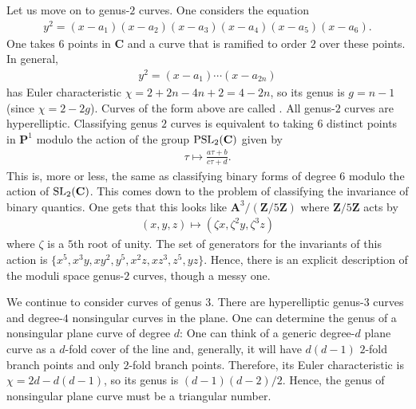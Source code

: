 \documentclass[11pt, oneside,margin=1in]{article}
\begin{document}
Let us move on to genus-$2$ curves. One considers the equation
\begin{align*}
	y^2 = (x-a_1)(x-a_2)(x-a_3)(x-a_4) (x-a_5) (x-a_6).
\end{align*}
One takes $6$ points in $\mathbf{C}$ and a curve that is ramified to order $2$ over these points. In general,
\begin{align*}
	y^2 = (x-a_1)\cdots (x-a_{2n})
\end{align*}
has Euler characteristic $\chi = 2+2n-4n +2 = 4-2n$, so its genus is $g=n-1$ (since $\chi = 2-2g$). Curves of the form above are called . All genus-$2$ curves are hyperelliptic. Classifying genus $2$ curves is equivalent to taking $6$ distinct points in $\mathbf{P}^1$ modulo the action of the group $\operatorname{PSL}_{2}(\mathbf{C})$ given by
\begin{align*}
	\tau \longmapsto \frac{a\tau+b}{c\tau+d}.
\end{align*}
This is, more or less, the same as classifying binary forms of degree $6$ modulo the action of $\operatorname{SL}_{2}(\mathbf{C})$. This comes down to the problem of classifying the invariance of binary quantics. One gets that this looks like $\mathbf{A}^3/(\mathbf{Z}/5\mathbf{Z})$ where $\mathbf{Z}/5\mathbf{Z}$ acts by
\begin{align*}
	(x,y,z) \longmapsto  (\zeta x,\zeta^2 y, \zeta^3 z)
\end{align*}
where $\zeta$ is a $5$th root of unity. The set of generators for the invariants of this action is $\{x^5,x^3y,xy^2,y^5,x^2z, xz^3, z^5, yz\}$. Hence, there is an explicit description of the moduli space genus-$2$ curves, though a messy one. 

We continue to consider curves of genus $3$. There are hyperelliptic genus-$3$ curves and degree-$4$ nonsingular curves in the plane. One can determine the genus of a nonsingular plane curve of degree $d$: One can think of a generic degree-$d$ plane curve as a $d$-fold cover of the line and, generally, it will have $d(d-1)$ $2$-fold branch points and only $2$-fold branch points. Therefore, its Euler characteristic is $\chi = 2d -  d(d-1)$, so its genus is $(d-1) (d-2)/2$. Hence, the genus of nonsingular plane curve must be a triangular number.
\end{document}
